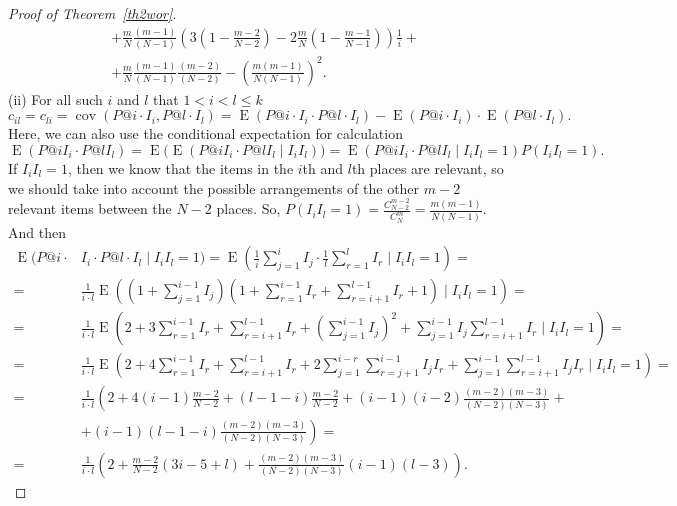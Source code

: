 \documentclass[10pt,a4paper]{amsart}
\begin{document}
\begin{proof}[Proof of Theorem~\ref {th2wor}]
\begin{equation*}
\begin{split}
& + \frac{m}{N}\frac{(m-1)}{(N-1)}\left(3\left(1-\frac{m-2}{N-2}\right)-2\frac{m}{N}\left(1-\frac{m-1}{N-1}\right)\right)\frac{1}{i}+\\ 
& + \frac{m}{N} \frac{(m-1)}{(N-1)}\frac{(m-2)}{(N-2)}-\left(\frac{m(m-1)}{N(N-1)}\right)^2 .
\end{split}
\end{equation*}
(ii)
For all such $i$ and $l$ that $1<i<l\leq k$
$$c_{il}=c_{li}=\operatorname{cov}(P@i\cdot I_i,P@l\cdot I_l)=\operatorname{E}(P@i\cdot I_i\cdot P@l\cdot I_l)-\operatorname{E}(P@i\cdot I_i)\cdot \operatorname{E}(P@l\cdot I_l).$$
Here, we can also use the conditional expectation for calculation
\[
\operatorname{E}(P@i I_i\cdot P@l I_l) = \operatorname{E}\big(\operatorname{E}(P@i I_i\cdot P@l I_l \mid I_i I_l)\big) 
= \operatorname{E}(P@i I_i\cdot P@l I_l \mid I_i I_l = 1)  P(I_i I_l = 1).
\]
If $I_iI_l=1$, then we know that the items in the $i$th and $l$th places are relevant, so we should take into account the possible arrangements of the other $m-2$ relevant items between the $N-2$ places. So,  
$P(I_iI_l=1)=\frac{C_{N-2}^{m-2}}{C_N^m}=\frac{m(m-1)}{N(N-1)}$. And then
\begin{equation*}
\begin{split}
\operatorname{E}(P@i\cdot & I_i\cdot P@l\cdot I_l \mid I_i I_l = 1)=\operatorname{E}\left(\frac{1}{i} \sum_{j=1}^{i} I_j 
\cdot \frac{1}{l} \sum_{r=1}^{l} I_r \mid I_i I_l = 1\right)=\\
= &\frac{1}{i\cdot l}\operatorname{E}\left(\left(1+\sum_{j=1}^{i-1}I_j\right)\left(1+\sum_{r=1}^{i-1}I_r+\sum_{r=i+1}^{l-1}I_r+1\right) \mid I_iI_l=1\right)=\\
= &\frac{1}{i\cdot l}\operatorname{E}\left(2+3\sum_{r=1}^{i-1}I_r+\sum_{r=i+1}^{l-1}I_r+\left(\sum_{j=1}^{i-1}I_j\right)^2+\sum_{j=1}^{i-1}I_j\sum_{r=i+1}^{l-1}I_r \mid I_iI_l=1\right)=\\
=&\frac{1}{i\cdot l}\operatorname{E}\left(2+4\sum_{r=1}^{i-1}I_r+\sum_{r=i+1}^{l-1}I_r+2\sum_{j=1}^{i-r}\sum_{r=j+1}^{i-1}I_jI_r+\sum_{j=1}^{i-1}\sum_{r=i+1}^{l-1}I_jI_r \mid I_iI_l=1\right)=\\
=&\frac{1}{i\cdot l}\left(2+4(i-1)\frac{m-2}{N-2}+(l-1-i)\frac{m-2}{N-2}+(i-1)(i-2)\frac{(m-2)(m-3)}{(N-2)(N-3)}+\right.\\
& \left. +(i-1)(l-1-i)\frac{(m-2)(m-3)}{(N-2)(N-3)}\right)=\\
= &\frac{1}{i\cdot l}\left(2+\frac{m-2}{N-2}(3i-5+l)+\frac{(m-2)(m-3)}{(N-2)(N-3)}(i-1)(l-3)\right).
\end{split}
\end{equation*}

\end{proof}
\end{document}
